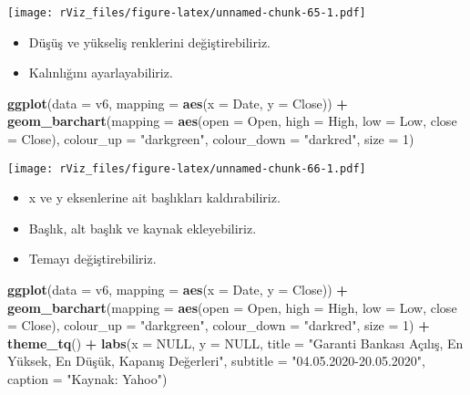 \documentclass[
]{book}
\newenvironment{Shaded}{\begin{snugshade}}{\end{snugshade}}
\newcommand{\DataTypeTok}[1]{\textcolor[rgb]{0.13,0.29,0.53}{#1}}
\newcommand{\DecValTok}[1]{\textcolor[rgb]{0.00,0.00,0.81}{#1}}
\newcommand{\KeywordTok}[1]{\textcolor[rgb]{0.13,0.29,0.53}{\textbf{#1}}}
\newcommand{\NormalTok}[1]{#1}
\newcommand{\OperatorTok}[1]{\textcolor[rgb]{0.81,0.36,0.00}{\textbf{#1}}}
\newcommand{\OtherTok}[1]{\textcolor[rgb]{0.56,0.35,0.01}{#1}}
\newcommand{\StringTok}[1]{\textcolor[rgb]{0.31,0.60,0.02}{#1}}
\begin{document}
\texttt{[image: rViz\_files/figure-latex/unnamed-chunk-65-1.pdf]}

\begin{itemize}
\item
  Düşüş ve yükseliş renklerini değiştirebiliriz.
\item
  Kalınlığını ayarlayabiliriz.
\end{itemize}

\begin{Shaded}
\begin{Highlighting}[]
\KeywordTok{ggplot}\NormalTok{(}\DataTypeTok{data =}\NormalTok{ v6, }\DataTypeTok{mapping =} \KeywordTok{aes}\NormalTok{(}\DataTypeTok{x =}\NormalTok{ Date, }\DataTypeTok{y =}\NormalTok{ Close)) }\OperatorTok{+}
\StringTok{  }\KeywordTok{geom_barchart}\NormalTok{(}\DataTypeTok{mapping =} \KeywordTok{aes}\NormalTok{(}\DataTypeTok{open =}\NormalTok{ Open, }\DataTypeTok{high =}\NormalTok{ High, }\DataTypeTok{low =}\NormalTok{ Low, }\DataTypeTok{close =}\NormalTok{ Close),}
                   \DataTypeTok{colour_up =} \StringTok{"darkgreen"}\NormalTok{, }\DataTypeTok{colour_down =} \StringTok{"darkred"}\NormalTok{, }\DataTypeTok{size =} \DecValTok{1}\NormalTok{)}
\end{Highlighting}
\end{Shaded}

\texttt{[image: rViz\_files/figure-latex/unnamed-chunk-66-1.pdf]}

\begin{itemize}
\item
  x ve y eksenlerine ait başlıkları kaldırabiliriz.
\item
  Başlık, alt başlık ve kaynak ekleyebiliriz.
\item
  Temayı değiştirebiliriz.
\end{itemize}

\begin{Shaded}
\begin{Highlighting}[]
\KeywordTok{ggplot}\NormalTok{(}\DataTypeTok{data =}\NormalTok{ v6, }\DataTypeTok{mapping =} \KeywordTok{aes}\NormalTok{(}\DataTypeTok{x =}\NormalTok{ Date, }\DataTypeTok{y =}\NormalTok{ Close)) }\OperatorTok{+}
\StringTok{  }\KeywordTok{geom_barchart}\NormalTok{(}\DataTypeTok{mapping =} \KeywordTok{aes}\NormalTok{(}\DataTypeTok{open =}\NormalTok{ Open, }\DataTypeTok{high =}\NormalTok{ High, }\DataTypeTok{low =}\NormalTok{ Low, }\DataTypeTok{close =}\NormalTok{ Close),}
                   \DataTypeTok{colour_up =} \StringTok{"darkgreen"}\NormalTok{, }\DataTypeTok{colour_down =} \StringTok{"darkred"}\NormalTok{, }\DataTypeTok{size =} \DecValTok{1}\NormalTok{) }\OperatorTok{+}
\StringTok{  }\KeywordTok{theme_tq}\NormalTok{() }\OperatorTok{+}
\StringTok{  }\KeywordTok{labs}\NormalTok{(}\DataTypeTok{x =} \OtherTok{NULL}\NormalTok{,}
       \DataTypeTok{y =} \OtherTok{NULL}\NormalTok{,}
       \DataTypeTok{title =} \StringTok{"Garanti Bankası Açılış, En Yüksek, En Düşük, Kapanış Değerleri"}\NormalTok{,}
       \DataTypeTok{subtitle =} \StringTok{"04.05.2020-20.05.2020"}\NormalTok{,}
       \DataTypeTok{caption =} \StringTok{"Kaynak: Yahoo"}\NormalTok{)}
\end{Highlighting}
\end{Shaded}
\end{document}
